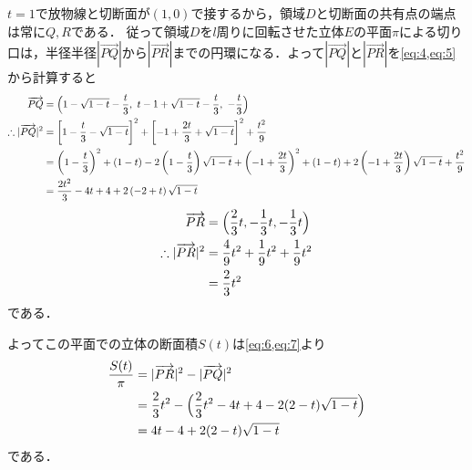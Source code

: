 \documentclass[../../main.tex]{subfiles}
\begin{document}
$t=1$で放物線と切断面が$(1,0)$で接するから，領域$D$と切断面の共有点の端点は常に$Q,R$である．
従って領域$D$を$l$周りに回転させた立体$E$の平面$\pi$による切り口は，半径半径$|\overrightarrow{PQ}|$から$|\overrightarrow{PR}|$までの円環になる．よって$|\overrightarrow{PQ}|$と$|\overrightarrow{PR}|$を\cref{eq:4,eq:5}から計算すると
\begin{align}
  \overrightarrow{PQ}
  &=\Bigl(1-\sqrt{1-t}-\dfrac{t}{3},\ t-1 + \sqrt{1-t}-\dfrac{t}{3},\ -\dfrac{t}{3}\Bigr) \\
  \therefore
  |\overrightarrow{PQ}|^2
  &=\left[1-\dfrac{t}{3}-\sqrt{1-t}\right]^2 + \left[-1+\dfrac{2t}{3} + \sqrt{1-t}\right]^2 + \dfrac{t^2}{9} \\
  &=\left(1-\dfrac{t}{3}\right)^2 + (1-t) -2\left(1-\dfrac{t}{3}\right)\sqrt{1-t}
  + \left(-1+\dfrac{2t}{3}\right)^2 + (1-t) + 2\left(-1+\dfrac{2t}{3}\right)\sqrt{1-t}
  + \dfrac{t^2}{9} \\
  &=\dfrac{2t^2}{3} - 4t + 4 + 2\left(-2 + t\right)\sqrt{1-t} \label{eq:6}
\end{align}
\begin{align}
  \overrightarrow{PR}
  &=\Bigl(\dfrac{2}{3}t,-\dfrac{1}{3}t,-\dfrac{1}{3}t\Bigr) \\
  \therefore
  |\overrightarrow{PR}|^2
  &=\dfrac{4}{9}t^2+\dfrac{1}{9}t^2+\dfrac{1}{9}t^2 \\
  &=\dfrac{2}{3}t^2 \label{eq:7}
\end{align}
である．

よってこの平面での立体の断面積$S(t)$は\cref{eq:6,eq:7}より
\begin{align}
  \dfrac{S(t)}{\pi}
  &=|\overrightarrow{PR}|^2-|\overrightarrow{PQ}|^2 \\
  &=\dfrac{2}{3}t^2-\Bigl(\dfrac{2}{3}t^2-4t+4-2(2-t)\sqrt{1-t}\Bigr) \\
  &=4t-4+2(2-t)\sqrt{1-t} \label{eq:8}
\end{align}
である．
\end{document}
